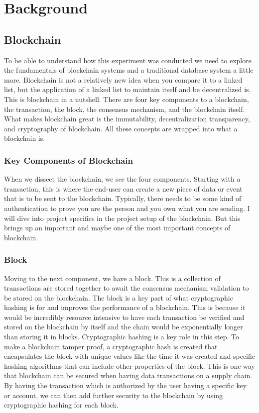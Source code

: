 \documentclass[conference]{IEEEtran} %
\begin{document}
\section{Background} %
\subsection{Blockchain} %
To be able to understand how this experiment was conducted we need to explore the fundamentals of blockchain systems and a traditional database system a little more.
Blockchain is not a relatively new idea when you compare it to a linked list, but the application of a linked list to maintain itself and be decentralized is. This is blockchain in a nutshell. There are four key components to a blockchain, the transaction, the block, the consensus mechanism, and the blockchain itself. What makes blockchain great is the immutability, decentralization transparency, and cryptography of blockchain. All these concepts are wrapped into what a blockchain is.
\subsubsection{Key Components of Blockchain} %
When we dissect the blockchain, we see the four components. Starting with a transaction, this is where the end-user can create a new piece of data or event that is to be sent to the blockchain. Typically, there needs to be some kind of authentication to prove you are the person and you own what you are sending. I will dive into project specifics in the project setup of the blockchain. But this brings up an important and maybe one of the most important concepts of blockchain.
\subsubsection{Block} %
Moving to the next component, we have a block. This is a collection of transactions are stored together to await the consensus mechanism validation to be stored on the blockchain. The block is a key part of what cryptographic hashing is for and improves the performance of a blockchain. This is because it would be incredibly resource intensive to have each transaction be verified and stored on the blockchain by itself and the chain would be exponentially longer than storing it in blocks. Cryptographic hashing is a key role in this step. To make a blockchain tamper proof, a cryptographic hash is created that encapsulates the block with unique values like the time it was created and specific hashing algorithms that can include other properties of the block. This is one way that blockchain can be secured when having data transactions on a supply chain. By having the transaction which is authorized by the user having a specific key or account, we can then add further security to the blockchain by using cryptographic hashing for each block.
\end{document}
